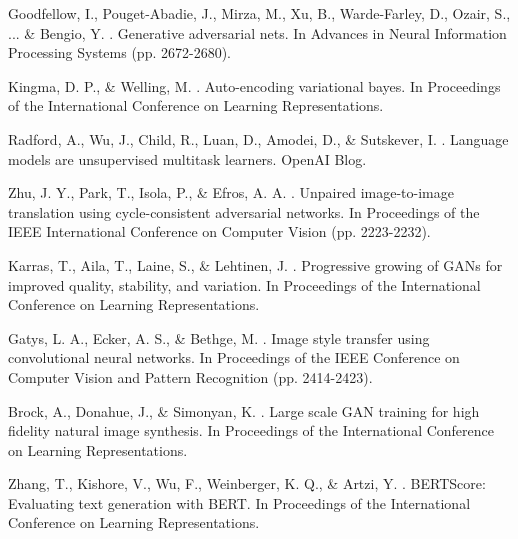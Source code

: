 \documentclass[12pt,a4paper]{article}
\begin{document}

\begin{thebibliography}{99}

Goodfellow, I., Pouget-Abadie, J., Mirza, M., Xu, B., Warde-Farley, D., Ozair, S., ... \& Bengio, Y. . Generative adversarial nets. In Advances in Neural Information Processing Systems (pp. 2672-2680).

Kingma, D. P., \& Welling, M. . Auto-encoding variational bayes. In Proceedings of the International Conference on Learning Representations.

Radford, A., Wu, J., Child, R., Luan, D., Amodei, D., \& Sutskever, I. . Language models are unsupervised multitask learners. OpenAI Blog.

Zhu, J. Y., Park, T., Isola, P., \& Efros, A. A. . Unpaired image-to-image translation using cycle-consistent adversarial networks. In Proceedings of the IEEE International Conference on Computer Vision (pp. 2223-2232).

Karras, T., Aila, T., Laine, S., \& Lehtinen, J. . Progressive growing of GANs for improved quality, stability, and variation. In Proceedings of the International Conference on Learning Representations.

Gatys, L. A., Ecker, A. S., \& Bethge, M. . Image style transfer using convolutional neural networks. In Proceedings of the IEEE Conference on Computer Vision and Pattern Recognition (pp. 2414-2423).

Brock, A., Donahue, J., \& Simonyan, K. . Large scale GAN training for high fidelity natural image synthesis. In Proceedings of the International Conference on Learning Representations.

Zhang, T., Kishore, V., Wu, F., Weinberger, K. Q., \& Artzi, Y. . BERTScore: Evaluating text generation with BERT. In Proceedings of the International Conference on Learning Representations.

\end{thebibliography}
\end{document}
